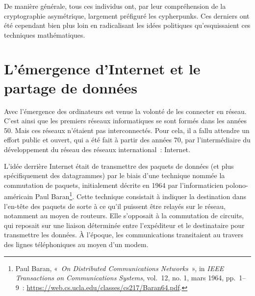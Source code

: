 \documentclass[
  a5paper,
  smalldemyvopaper,10pt,twoside,onecolumn,openright,extrafontsizes,hidelinks]{memoir}
\begin{document}
De manière générale, tous ces individus ont, par leur compréhension de
la cryptographie asymétrique, largement préfiguré les cypherpunks. Ces
derniers ont été cependant bien plus loin en radicalisant les idées
politiques qu'esquissaient ces techniques mathématiques.

\section*{L'émergence d'Internet et le partage de
données}\label{luxe9mergence-dinternet-et-le-partage-de-donnuxe9es}


Avec l'émergence des ordinateurs est venue la volonté de les connecter
en réseau. C'est ainsi que les premiers réseaux informatiques se sont
formés dans les années 50. Mais ces réseaux n'étaient pas
interconnectés. Pour cela, il a fallu attendre un effort public et
ouvert, qui a été fait à partir des années 70, par l'intermédiaire du
développement du réseau des réseaux international~: Internet.

L'idée derrière Internet était de transmettre des paquets de données (et
plus spécifiquement des datagrammes) par le biais d'une technique nommée
la commutation de paquets, initialement décrite en 1964 par
l'informaticien polono-américain Paul Baran\footnote{Paul Baran,
  «~\emph{On Distributed Communications Networks}~», in \emph{IEEE
  Transactions on Communications Systems}, vol.~12, no. 1, mars 1964,
  pp.~1--9~: \url{https://web.cs.ucla.edu/classes/cs217/Baran64.pdf}.}.
Cette technique consistait à indiquer la destination dans l'en-tête des
paquets de sorte à ce qu'il puissent être relayés sur le réseau,
notamment au moyen de routeurs. Elle s'opposait à la commutation de
circuits, qui reposait sur une liaison déterminée entre l'expéditeur et
le destinataire pour transmettre les données. À l'époque, les
communications transitaient au travers des lignes téléphoniques au moyen
d'un modem.
\end{document}
